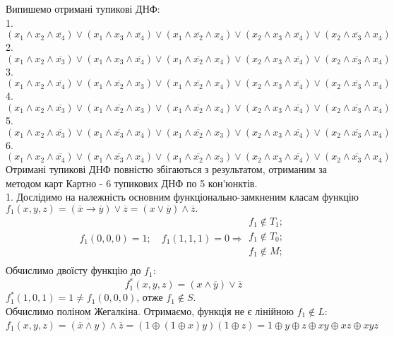 \documentclass[14pt,a4paper]{scrartcl}
\theoremstyle{definition}
\theoremstyle{remark}
\theoremstyle{definition}
\theoremstyle{definition}
\begin{document}
Випишемо отримані тупикові ДНФ:\\
1. $(x_1 \wedge x_2 \wedge \overline{x_4}) \vee (x_1 \wedge x_3 \wedge \overline{x_4}) \vee (x_1 \wedge \overline{x_2} \wedge x_4) \vee
(x_2 \wedge x_3 \wedge \overline{x_4}) \vee (x_2 \wedge \overline{x_3} \wedge x_4) $
2. $  (x_1 \wedge x_2 \wedge \overline{x_3}) \vee (x_1 \wedge x_3 \wedge \overline{x_4}) \vee (x_1 \wedge \overline{x_2} \wedge x_4) \vee
(x_2 \wedge x_3 \wedge \overline{x_4}) \vee (x_2 \wedge \overline{x_3} \wedge x_4) $
3. $ (x_1 \wedge x_2 \wedge \overline{x_4}) \vee (x_1 \wedge \overline{x_2} \wedge x_3) \vee (x_1 \wedge \overline{x_2} \wedge x_4) \vee
(x_2 \wedge x_3 \wedge \overline{x_4}) \vee (x_2 \wedge \overline{x_3} \wedge x_4) $
4. $ (x_1 \wedge x_2 \wedge \overline{x_3}) \vee (x_1 \wedge \overline{x_2} \wedge x_3) \vee (x_1 \wedge \overline{x_2} \wedge x_4) \vee
(x_2 \wedge x_3 \wedge \overline{x_4}) \vee (x_2 \wedge \overline{x_3} \wedge x_4)$
5. $(x_1 \wedge x_2 \wedge \overline{x_3}) \vee(x_1 \wedge \overline{x_3} \wedge x_4) \vee (x_1 \wedge \overline{x_2} \wedge x_3) \vee
(x_2 \wedge x_3 \wedge \overline{x_4}) \vee (x_2 \wedge \overline{x_3} \wedge x_4)$
6. $(x_1 \wedge x_2 \wedge \overline{x_4}) \vee(x_1 \wedge \overline{x_3} \wedge x_4) \vee (x_1 \wedge \overline{x_2} \wedge x_3) \vee
(x_2 \wedge x_3 \wedge \overline{x_4}) \vee (x_2 \wedge \overline{x_3} \wedge x_4)$\\
Отримані тупикові ДНФ повністю збігаються з результатом, отриманим за методом карт Картно - 6 тупикових ДНФ по 5 кон'юнктів.
\pagebreak\\
1. Дослідимо на належність основним функціонально-замкненим класам функцію $f_1 (x, y, z) = \left( \overline{x} \rightarrow \overline{y} \right) \vee \overline{z} = (x \vee \overline{y}) \wedge \overline{z}.$
$$
f_1(0, 0, 0) = 1; \quad f_1(1, 1, 1) = 0 \Longrightarrow \begin{gathered}
 f_1 \notin T_1;\\
 f_1 \notin T_0;\\
 f_1 \notin M;\\
\end{gathered}
$$
Обчислимо двоїсту функцію до $f_1:$
$$f_1^*(x,y,z) = (x \wedge \overline{y}) \vee \overline{z} $$
$f^*_1(1, 0, 1) = 1 \neq f_1(0, 0, 0)$, отже $f_1 \notin S$.\\
Обчислимо поліном Жегалкіна. Отримаємо, функція не є лінійною $f_1 \notin L$:\\
$$
f_1(x, y, z) = \overline{(\overline{x} \wedge y) }\wedge \overline{z} =
(1 \oplus(1 \oplus x)y)(1\oplus z) = 1 \oplus y \oplus z \oplus xy \oplus xz \oplus xyz
$$
\end{document}
